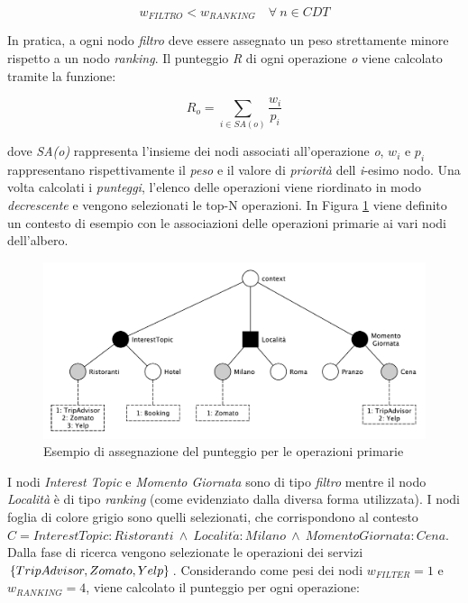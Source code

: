 \begin{equation*}
	w_{FILTRO} < w_{RANKING} \quad \forall\ n \in CDT
\end{equation*}

In pratica, a ogni nodo \emph{filtro} deve essere assegnato un peso strettamente minore rispetto a un nodo \emph{ranking}. Il punteggio \emph{R} di ogni operazione \emph{o} viene calcolato tramite la funzione:

\begin{equation}\label{eq:primary-service-formula}
	R_o = \sum_{i \in SA(o)}{\frac{w_i}{p_i}}
\end{equation}

dove \emph{SA(o)} rappresenta l'insieme dei nodi associati all'operazione \emph{o}, $ w_i $ e $ p_i $ rappresentano rispettivamente il \emph{peso} e il valore di \emph{priorità} dell \emph{i}-esimo nodo. Una volta calcolati i \emph{punteggi}, l'elenco delle operazioni viene riordinato in modo \emph{decrescente} e vengono selezionati le top-N operazioni. In Figura \ref{fig:esempio-punteggio-primari} viene definito un contesto di esempio con le associazioni delle operazioni primarie ai vari nodi dell'albero.

\begin{figure}[ht]
	\centering
	\includegraphics[width=\textwidth]{4-metodologia/Immagini/esempio-punteggio-primari.pdf}
	\caption{Esempio di assegnazione del punteggio per le operazioni primarie}\label{fig:esempio-punteggio-primari}
\end{figure}

I nodi \emph{Interest Topic} e \emph{Momento Giornata} sono di tipo \emph{filtro} mentre il nodo \emph{Località} è di tipo \emph{ranking} (come evidenziato dalla diversa forma utilizzata). I nodi foglia di colore grigio sono quelli selezionati, che corrispondono al contesto $ C = InterestTopic: Ristoranti\ \land\ Localit\acute{a}: Milano\ \land\ MomentoGiornata: Cena $. Dalla fase di ricerca vengono selezionate le operazioni dei servizi $ \{TripAdvisor, Zomato,\\ Yelp\} $. Considerando come pesi dei nodi $ w_{FILTER} = 1 $  e $ w_{RANKING} = 4 $, viene calcolato il punteggio per ogni operazione:

